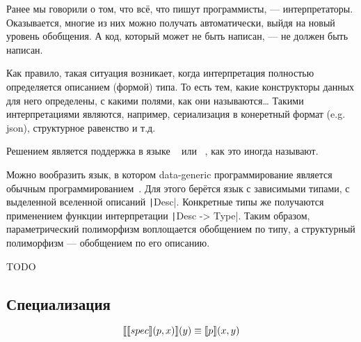 
Ранее мы говорили о том, что всё, что пишут программисты, --- интерпретаторы.
Оказывается, многие из них можно получать автоматически, выйдя на новый уровень обобщения.
А код, который может не быть написан, --- не должен быть написан.

Как правило, такая ситуация возникает, когда интерпретация полностью определяется описанием (формой) типа.
То есть тем, какие конструкторы данных для него определены, с какими полями, как они называются\ldots
Такими интерпретациями являются, например, сериализация в конеретный формат (e.g. json), структурное равенство и т.д.

Решением является поддержка в языке  ~\cite[глава 13]{maguire-types} или ~\cite{backhousedatatype}, как это иногда называют.


Можно вообразить язык, в котором data-generic программирование является обычным программированием~\cite{chapman2010gentle}.
Для этого берётся язык с зависимыми типами, с выделенной вселенной описаний \texttt|Desc|.
Конкретные типы же получаются применением функции интерпретации \texttt|Desc -> Type|.
Таким образом, параметрический полиморфизм воплощается обобщением по типу, а структурный полиморфизм --- обобщением по его описанию.





TODO %

\subsection{Специализация}

\[
    \llbracket{\llbracket{spec}\rrbracket(p, x)}\rrbracket(y) \equiv \llbracket{p}\rrbracket(x, y)
\]








